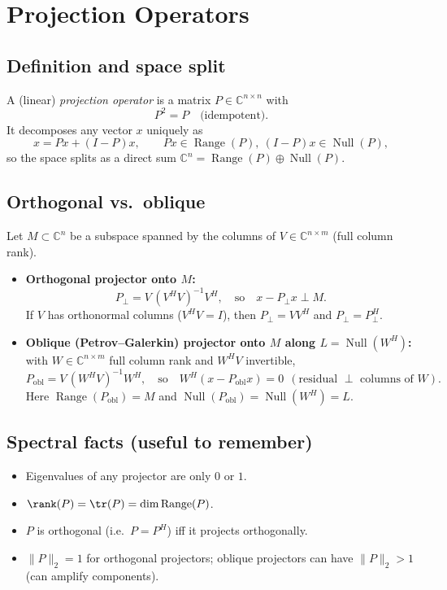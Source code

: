 \section{Projection Operators}

\subsection*{Definition and space split}
A (linear) \emph{projection operator} is a matrix \(P\in\mathbb{C}^{n\times n}\) with
\[
    P^2=P \quad\text{(idempotent).}
\]
It decomposes any vector \(x\) uniquely as
\[
    x = Px + (I-P)x, \qquad Px\in\operatorname{Range}(P),\ (I-P)x\in\operatorname{Null}(P),
\]
so the space splits as a direct sum \(\mathbb{C}^n=\operatorname{Range}(P)\oplus\operatorname{Null}(P)\).

\subsection*{Orthogonal vs.\ oblique}
Let \(M\subset\mathbb{C}^n\) be a subspace spanned by the columns of \(V\in\mathbb{C}^{n\times m}\) (full column rank).
\begin{itemize}
    \item \textbf{Orthogonal projector onto \(M\):}
          \[
              P_{\perp} = V\,(V^HV)^{-1}V^H,
              \quad\text{so}\quad x-P_{\perp}x \perp M.
          \]
          If \(V\) has orthonormal columns (\(V^HV=I\)), then \(P_{\perp}=VV^H\) and \(P_{\perp}=P_{\perp}^H\).

    \item \textbf{Oblique (Petrov--Galerkin) projector onto \(M\) along \(L=\operatorname{Null}(W^H)\):}
          with \(W\in\mathbb{C}^{n\times m}\) full column rank and \(W^HV\) invertible,
          \[
              P_{\text{obl}} = V\,(W^HV)^{-1}W^H,
              \quad\text{so}\quad W^H(x-P_{\text{obl}}x)=0 \ \ (\text{residual }\perp \text{ columns of }W).
          \]
          Here \(\operatorname{Range}(P_{\text{obl}})=M\) and \(\operatorname{Null}(P_{\text{obl}})=\operatorname{Null}(W^H)=L\).
\end{itemize}

\subsection*{Spectral facts (useful to remember)}
\begin{itemize}
    \item Eigenvalues of any projector are only \(0\) or \(1\).
    \item \(\rank(P)=\tr(P)=\dim\operatorname{Range}(P)\).
    \item \(P\) is orthogonal (i.e.\ \(P=P^H\)) iff it projects orthogonally.
    \item \(\|P\|_2=1\) for orthogonal projectors; oblique projectors can have \(\|P\|_2>1\) (can amplify components).
\end{itemize}

